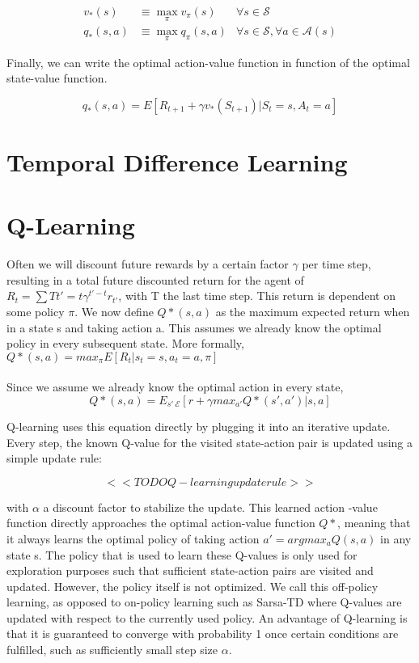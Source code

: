 \begin{align*}
  v_*(s) &\equiv \max_{\pi} v_\pi(s) & \forall s \in \mathcal{S} \\
  q_*(s, a) &\equiv \max_\pi q_\pi(s,a) & \forall s \in \mathcal{S},
  \forall a \in \mathcal{A}(s)
\end{align*}

Finally, we can write the optimal action-value function
in function of the optimal state-value function.

\begin{equation}
  q_*(s,a) = E[R_{t+1} + \gamma v_*(S_{t+1}) | S_t = s, A_t = a]
\end{equation}

\section{Temporal Difference Learning}

\section{Q-Learning}
Often we will discount future rewards
by a certain factor $\gamma$ per time step,
resulting in a total future discounted return
for the agent of
$R_t = \sum{T}{t'=t} \gamma^{t'-t}r_{t'}$,
with T the last time step.
This return is dependent on some policy $\pi$.
We now define $Q*(s,a)$ as the maximum expected return
when in a state s and taking action a.
This assumes we already know the optimal policy
in every subsequent state.
More formally,
$Q*(s,a) = max_{\pi}E[R_t|s_t=s, a_t=a, \pi]$

\paragraph{}
Since we assume we already know the optimal action in every state,
$$Q*(s,a) = E_{s'~\mathcal{E}}[r+\gamma max_{a'}Q*(s',a')|s,a]$$

Q-learning uses this equation directly
by plugging it into an iterative update.
Every step, the known Q-value for the visited state-action pair
is updated using a simple update rule:

$$<<TODO Q-learning update rule>>$$

with $\alpha$ a discount factor to stabilize the update.
This learned action	-value function directly approaches
the optimal action-value function $Q*$,
meaning that it always learns the optimal policy
of taking action $a' = argmax_{a}Q(s,a)$
in any state s.
The policy that is used to learn these Q-values
is only used for exploration purposes such that
sufficient state-action pairs are visited
and updated.
However, the policy itself is not optimized.
We call this off-policy learning,
as opposed to on-policy learning such as Sarsa-TD
where Q-values are updated with respect to
the currently used policy.
An advantage of Q-learning
is that it is guaranteed to converge
with probability 1
once certain conditions are fulfilled,
such as sufficiently small step size $\alpha$.

